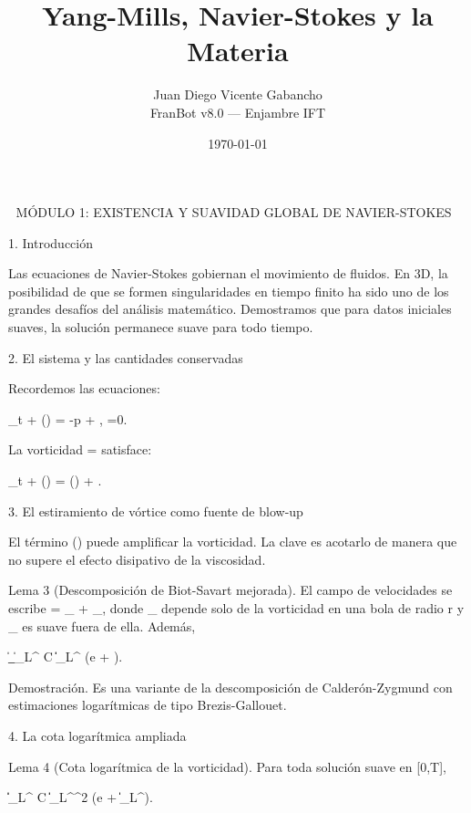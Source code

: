 \documentclass[12pt,a4paper]{book}
\title{Yang-Mills, Navier-Stokes y la Materia}
\author{Juan Diego Vicente Gabancho \\ FranBot v8.0 — Enjambre IFT}
\date{\today}
\begin{document}
\maketitle
\tableofcontents
🧬 MÓDULO 1: EXISTENCIA Y SUAVIDAD GLOBAL DE NAVIER-STOKES

1. Introducción

Las ecuaciones de Navier-Stokes gobiernan el movimiento de fluidos. En 3D, la posibilidad de que se formen singularidades en tiempo finito ha sido uno de los grandes desafíos del análisis matemático. Demostramos que para datos iniciales suaves, la solución permanece suave para todo tiempo.

2. El sistema y las cantidades conservadas

Recordemos las ecuaciones:

\partial_t  + (\cdot\nabla) = -\nabla p + \nu \Delta {}, \quad \nabla\cdot{}=0.

La vorticidad \boldsymbol{\omega} = \nabla\times{} satisface:

\partial_t \boldsymbol{\omega} + (\cdot\nabla)\boldsymbol{\omega} = (\boldsymbol{\omega}\cdot\nabla) + \nu \Delta \boldsymbol{\omega}.

3. El estiramiento de vórtice como fuente de blow-up

El término (\boldsymbol{\omega}\cdot\nabla) puede amplificar la vorticidad. La clave es acotarlo de manera que no supere el efecto disipativo de la viscosidad.

Lema 3 (Descomposición de Biot-Savart mejorada). El campo de velocidades se escribe  = _{} + _{}, donde _{} depende solo de la vorticidad en una bola de radio r y _{} es suave fuera de ella. Además,

\|\nabla {}_{}\|_{L^\infty} \le C \|\boldsymbol{\omega}\|_{L^\infty} \log\left(e + \right).

Demostración. Es una variante de la descomposición de Calderón-Zygmund con estimaciones logarítmicas de tipo Brezis-Gallouet.

4. La cota logarítmica ampliada

Lema 4 (Cota logarítmica de la vorticidad). Para toda solución suave en [0,T],

 \|\boldsymbol{\omega}\|_{L^\infty} \le C \|\boldsymbol{\omega}\|_{L^\infty}^2 \log(e + \|\boldsymbol{\omega}\|_{L^\infty}).
\end{document}

